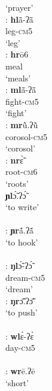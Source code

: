 \documentclass[output=paper]{langscibook}
\begin{document}
\begin{exe}
\begin{multicols}{2}
\begin{xlisti}
            {}      `prayer'\\
        \ex \glll [hl]:   \textbf{hl}ã̄-ʔã̄\\
            {} leg-\textsc{cm}5\\
            {} `leg'\\
        \ex \glll [hr]:      \textbf{hr}ō6\\
                {}          meal\\
                {}          `meals'\\
        \ex \glll [ml]:      \textbf{ml}ã̄-ʔã̄ \\
            {}          fight-\textsc{cm}5\\
            {}          `fight'\\
        \ex \glll  [mr]:       \textbf{mr}ũ̀.ʔũ̀ \\
            {}  corosol-\textsc{cm}5\\
            {}  `corosol'\\
        \ex \glll [nr]:      \textbf{nr}ɛ̃̀\\
            {}          root-\textsc{cm}6\\
            {}          `roots'\\
        \ex \glll [ɲl] \textbf{ɲl}ɔ̃́.ʔɔ̃́\\
            {}  {`to write'}\\
            {} {} \\
        \ex \glll [ɲr]:      \textbf{ɲr}ã́.ʔã́ \\
            {}      {`to hook'}\\
            {} {} \\
        \ex \glll [ŋl]:       \textbf{ŋl}ɔ̃́-ʔɔ̃́\\
            {} dream-\textsc{cm}5\\
            {} `dream'\\
        \ex \glll [ŋr]:       \textbf{ŋr}ɔ̃̄.ʔɔ̃̄    \\
            {}  {`to push'}\\
            {} {} \\
        \ex  \glll [wl]:       \textbf{wl}ɛ̀-ʔɛ̀ \\
                {}          day-\textsc{cm}5\\
                {} {} \\
        \ex \glll [wr]:       \textbf{wr}ē.ʔē  \\
                {}          `short'\\
                {} {} \\

\end{xlisti}
\end{multicols}
\end{exe}
\end{document}
